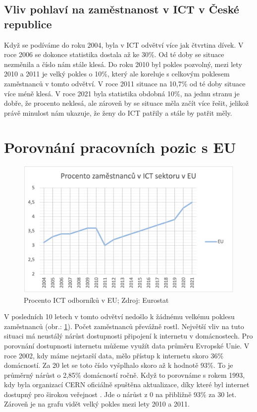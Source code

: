 \documentclass[12pt]{report}			%
\begin{document}
            \subsection{Vliv pohlaví na zaměstnanost v ICT v České republice}
                Když se podíváme do roku 2004, byla v ICT odvětví více jak čtvrtina dívek. V roce 2006 se dokonce statistika dostala až ke 30\%. Od té doby se situace nezměnila a číslo nám stále klesá. Do roku 2010 byl pokles pozvolný, mezi lety 2010 a 2011 je velký pokles o 10\%, který ale koreluje s celkovým poklesem zaměstnanců v tomto odvětví. V roce 2011 situace na 10,7\% od té doby situace více méně klesá. V roce 2021 byla statistika obdobná 10\%, na jednu stranu je dobře, že procento neklesá, ale zároveň by se situace měla začít více řešit, jelikož právě minulost nám ukazuje, že ženy do ICT patřily a stále by patřit měly.\cite{EmployedICTSpecialstBySex}
                
  
        \section{Porovnání pracovních pozic s EU}
                \begin{figure}[h]
                    \centering
                    \includegraphics[width=16cm]{Maturitni Prace/images/odbornici_ICT_EU.png} 
                    \caption[Procento ICT odborníků v EU 2004/21]{Procento ICT odborníků v EU; Zdroj: Eurostat}
                    \label{fig:odbornici_ICT_EU}
                \end{figure}
                V posledních 10 letech v tomto odvětví nedošlo k žádnému velkému poklesu zaměstnanců (obr.: \ref{fig:odbornici_ICT_EU}). Počet zaměstnanců převážně rostl. Největší vliv na tuto situaci má neustálý nárůst dostupnosti připojení k internetu v domácnostech. Pro porovnání dostupnosti internetu můžeme využít data průměru Evropské Unie. V roce 2002, kdy máme nejstarší data, mělo přístup k internetu skoro 36\% domácností. Za 20 let se toto číslo vyšplhalo skoro až k hodnotě 93\%. To je průměrný nárůst o 2,85\% domácností ročně. Když to porovnáme s rokem 1993, kdy byla organizací CERN oficiálně spuštěna aktualizace, díky které byl internet dostupný pro širokou veřejnost \cite{InternetMadePublic}. Jde o nárůst z 0 na přibližně 93\% za 30 let. Zároveň je na grafu vidět velký pokles mezi lety 2010 a 2011.\cite{EmployedICTSpecialists-Total} \cite{HouseholdsInternetAccess}
                
\end{document}
